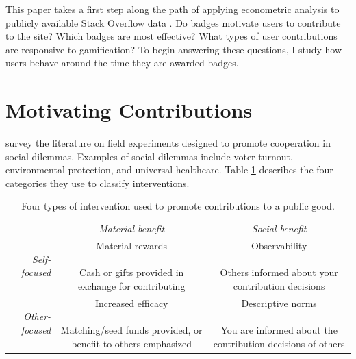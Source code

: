 \documentclass{article}
\newcommand{\1}{\mathds{1}}
\newcommand{\myrotate}[1]{#1}
\newcommand{\PreserveBackslash}[1]{\let\temp=\\#1\let\\=\temp}
\newcommand{\mycell}[1]{\parbox[m]{1.1in}{\PreserveBackslash\raggedright \vspace{7pt} #1 \vspace{7pt}}}
\begin{document}
This paper takes a first step along the path of applying econometric analysis to publicly available Stack Overflow data \cite{se-dump}. Do badges motivate users to contribute to the site? Which badges are most effective? What types of user contributions are responsive to gamification? To begin answering these questions, I study how users behave around the time they are awarded badges.

\section{Motivating Contributions}

\citet{Kraft-Todd} survey the literature on field experiments designed
to promote cooperation in social dilemmas. Examples of social dilemmas include voter turnout,
environmental protection, and universal healthcare. Table
\ref{tab:kraft-todd} describes the four categories they use to
classify interventions.

\begin{table}[h!tbp]
  \centering
  \renewcommand{\arraystretch}{2}
  \caption{Four types of intervention used to promote contributions to a public good.}
  \label{tab:kraft-todd}
  \begin{tabular}{r|c|c|}

    \multicolumn{1}{c}{} & \multicolumn{1}{c}{\textit{Material-benefit}} & \multicolumn{1}{c}{\textit{Social-benefit}} \\
    \cline{2-3}

    \myrotate{\textit{Self-focused}} & \mycell{ Material rewards \\ \\ Cash or gifts provided in exchange for contributing } & \mycell{Observability \\ \\ Others informed about your contribution decisions} \\


    \myrotate{\textit{Other-focused}} & \mycell{ Increased efficacy \\ \\ Matching/seed funds provided, or benefit to others emphasized } & \mycell{Descriptive norms \\ \\ You are informed about the contribution decisions of others} \\

  \end{tabular}
\end{table}
\end{document}
